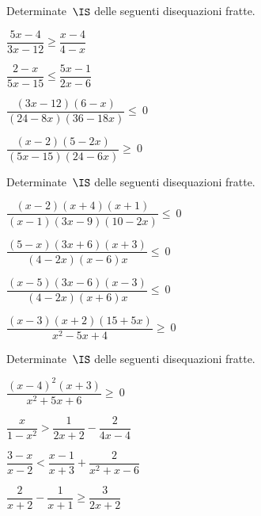 \begin{esercizio}[\Ast]
\label{ese:21.59}
Determinate~$\IS$ delle seguenti disequazioni fratte.
\begin{multicols}{2}
\begin{enumeratea}
\spazielenx
 \item $\dfrac{5x-4}{3x-12}\ge \dfrac{x-4}{4-x}$
\item $\dfrac{2-x}{5x-15}\le \dfrac{5x-1}{2x-6}$
\item $\dfrac{(3x-12)(6-x)}{(24-8x)(36-18x)}\leqslant~0$
\item $\dfrac{(x-2)(5-2x)}{(5x-15)(24-6x)}\geqslant~0$
\end{enumeratea}
\end{multicols}
\end{esercizio}


\begin{esercizio}[\Ast]
\label{ese:21.60}
Determinate~$\IS$ delle seguenti disequazioni fratte.
\begin{multicols}{2}
\begin{enumeratea}
\spazielenx
\item $\dfrac{(x-2)(x+4)(x+1)}{(x-1)(3x-9)(10-2x)}\leqslant~0$
\item $\dfrac{(5-x)(3x+6)(x+3)}{(4-2x)(x-6)x}\leqslant~0$
\item $\dfrac{(x-5)(3x-6)(x-3)}{(4-2x)(x+6)x}\leqslant~0$
\item $\dfrac{(x-3)(x+2)(15+5x)}{x^{2}-5x+4}\geqslant~0$
\end{enumeratea}
\end{multicols}
\end{esercizio}

\begin{esercizio}[\Ast]
\label{ese:21.61}
Determinate~$\IS$ delle seguenti disequazioni fratte.
\begin{multicols}{2}
\begin{enumeratea}
\spazielenx
\item $\dfrac{\left(x-4\right)^{2}(x+3)}{x^{2}+5x+6}\geqslant~0$
\item $\dfrac{x}{1-x^{2}}>\dfrac{1}{2x+2}-\dfrac{2}{4x-4}$
\item $\dfrac{3-x}{x-2}<\dfrac{x-1}{x+3}+\dfrac{2}{x^{2}+x-6}$
\item $\dfrac{2}{x+2}-\dfrac{1}{x+1}\ge \dfrac{3}{2x+2}$
\end{enumeratea}
\end{multicols}
\end{esercizio}

